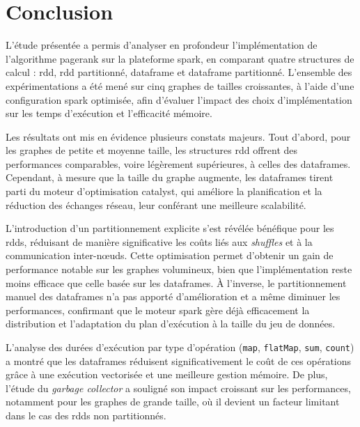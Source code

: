 \documentclass[conference]{IEEEtran}
\begin{document}
\clearpage

\section{Conclusion}

L'étude présentée a permis d'analyser en profondeur l'implémentation de l'algorithme \gls{pagerank} sur la plateforme \gls{spark}, en comparant quatre structures de calcul : \gls{rdd}, \gls{rdd} partitionné, \gls{dataframe} et \gls{dataframe} partitionné.  
L'ensemble des expérimentations a été mené sur cinq graphes de tailles croissantes, à l'aide d'une configuration \gls{spark} optimisée, afin d'évaluer l'impact des choix d'implémentation sur les temps d'exécution et l'efficacité mémoire.

Les résultats ont mis en évidence plusieurs constats majeurs.  
Tout d'abord, pour les graphes de petite et moyenne taille, les structures \gls{rdd} offrent des performances comparables, voire légèrement supérieures, à celles des \glspl{dataframe}.  
Cependant, à mesure que la taille du graphe augmente, les \glspl{dataframe} tirent parti du moteur d'optimisation \gls{catalyst}, qui améliore la planification et la réduction des échanges réseau, leur conférant une meilleure scalabilité.

L'introduction d'un partitionnement explicite s'est révélée bénéfique pour les \glspl{rdd}, réduisant de manière significative les coûts liés aux \textit{shuffles} et à la communication inter-nœuds.  
Cette optimisation permet d'obtenir un gain de performance notable sur les graphes volumineux, bien que l'implémentation reste moins efficace que celle basée sur les \glspl{dataframe}.  
À l'inverse, le partitionnement manuel des \glspl{dataframe} n'a pas apporté d'amélioration et a même diminuer les performances, confirmant que le moteur \gls{spark} gère déjà efficacement la distribution et l'adaptation du plan d'exécution à la taille du jeu de données.

L'analyse des durées d'exécution par type d'opération (\texttt{map}, \texttt{flatMap}, \texttt{sum}, \texttt{count}) a montré que les \glspl{dataframe} réduisent significativement le coût de ces opérations grâce à une exécution vectorisée et une meilleure gestion mémoire.  
De plus, l'étude du \textit{garbage collector} a souligné son impact croissant sur les performances, notamment pour les graphes de grande taille, où il devient un facteur limitant dans le cas des \glspl{rdd} non partitionnés.
\end{document}
